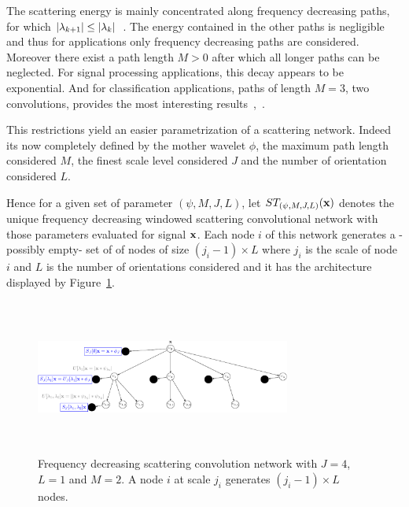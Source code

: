 \documentclass{article}
\begin{document}
    The scattering energy is mainly concentrated along frequency decreasing paths, \ie for which $\left| \lambda_{k+1} \right| \leq \left| \lambda_{k} \right|$~\citep{mallat gis}. The energy contained in the other paths is negligible and thus for applications only frequency decreasing paths are considered. Moreover there exist a path length $M > 0$ after which all longer paths can be neglected. For signal processing applications, this decay appears to be exponential. And for classification applications, paths of length $M = 3$, \ie two convolutions, provides the most interesting results~\citep{anden2011multiscale},~\citep{bruna2010classification}.
      
    This restrictions yield an easier parametrization of a scattering network. Indeed its now completely defined by the mother wavelet $\phi$, the maximum path length considered $M$, the finest scale level considered $J$ and the number of orientation considered $L$.
      
    Hence for a given set of parameter $(\psi, M,J,L)$, let $ST_{(\psi, M,J,L)}({\bf x})$ denotes the unique frequency decreasing windowed scattering convolutional network with those parameters evaluated for signal ${\bf x}$. Each node $i$ of this network generates a -possibly empty- set of of nodes of size $(j_{i}-1) \times L$ where $j_{i}$ is the scale of node $i$ and $L$ is the number of orientations considered and it has the architecture displayed by Figure~\ref{fig:SCN 2}.

    \begin{figure}
      \begin{center}
        \includegraphics[width=3.3in, height=2in, keepaspectratio]{ST_freqDec_crop.pdf}
        \caption[Frequency decreasing scattering convolution network.]{\centering  Frequency decreasing scattering convolution network with $J=4$, $L=1$ and $M=2$. A node $i$ at scale $j_{i}$ generates $(j_{i}-1) \times L$ nodes. }
        \label{fig:SCN 2}
      \end{center}
      \vspace{-15pt}
    \end{figure}
    
\end{document}

